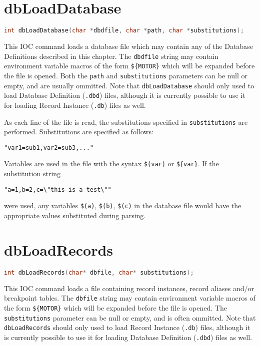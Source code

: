 \section{dbLoadDatabase}

\begin{lstlisting}[language=C]
int dbLoadDatabase(char *dbdfile, char *path, char *substitutions);
\end{lstlisting}

This IOC command loads a database file which may contain any of the Database Definitions described in this chapter.
The \verb|dbdfile| string may contain environment variable macros of the form \verb|${MOTOR}| which will be expanded before the file is opened.
Both the \verb|path| and \verb|substitutions| parameters can be null or empty, and are usually ommitted.
Note that \verb|dbLoadDatabase| should only used to load Database Definition (\verb|.dbd|) files, although it is currently possible to use it for loading Record Instance (\verb|.db|) files as well.

As each line of the file is read, the substitutions specified in \verb|substitutions| are performed. Substitutions are specified as follows:

\begin{lstlisting}[language=dbd]
"var1=sub1,var2=sub3,..."
\end{lstlisting}

Variables are used in the file with the syntax \verb|$(var)| or \verb|${var}|.
If the substitution string

\begin{lstlisting}[language=dbd]
"a=1,b=2,c=\"this is a test\""
\end{lstlisting}

were used, any variables \verb|$(a)|, \verb|$(b)|, \verb|$(c)| in the database file would have the appropriate values substituted during parsing.

\section{dbLoadRecords}

\begin{lstlisting}[language=C]
int dbLoadRecords(char* dbfile, char* substitutions);
\end{lstlisting}

This IOC command loads a file containing record instances, record aliases and/or breakpoint tables.
The \verb|dbfile| string may contain environment variable macros of the form \verb|${MOTOR}| which will be expanded before the file is opened.
The \verb|substitutions| parameter can be null or empty, and is often ommitted.
Note that \verb|dbLoadRecords| should only used to load Record Instance (\verb|.db|) files, although it is currently possible to use it for loading Database Definition (\verb|.dbd|) files as well.


